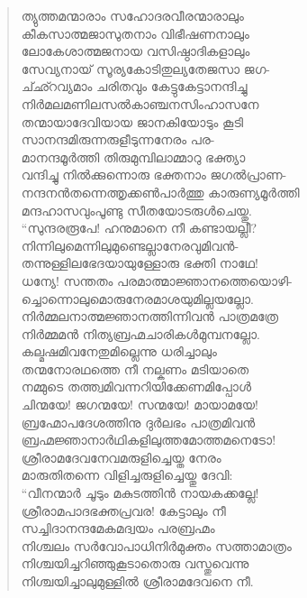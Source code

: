 \begin{verse}
ത്യുത്തമന്മാരാം സഹോദരവീരന്മാരാലും\\
കീകസാത്മജാസുതനാം വിഭീഷണനാലും\\
ലോകേശാത്മജനായ വസിഷ്ഠാദികളാലും\\
സേവ്യനായ് സൂര്യകോടിതുല്യതേജസാ ജഗ-\\
ച്ഛ്റവ്യമാം ചരിതവും കേട്ടുകേട്ടാനന്ദിച്ചു\\
നിര്‍മലമണിലസല്‍കാഞ്ചനസിംഹാസനേ\\
തന്മായാദേവിയായ ജാനകിയോടും കൂടി\\
സാനന്ദമിരുന്നരുളീടുന്നനേരം പര-\\
മാനന്ദമൂര്‍ത്തി തിരുമുമ്പിലാമ്മാറു ഭക്ത്യാ\\
വന്ദിച്ചു നില്‍ക്കുന്നൊരു ഭക്തനാം ജഗല്‍പ്രാണ-\\
നന്ദനന്‍തന്നെത്തൃക്കണ്‍പാര്‍ത്തു കാരുണ്യമൂര്‍ത്തി\\
മന്ദഹാസവുംപൂണ്ടു സീതയോടരുള്‍ചെയ്തു.\\
“സുന്ദരരൂപേ! ഹനുമാനെ നീ കണ്ടായല്ലീ?\\
നിന്നിലുമെന്നിലുമുണ്ടെല്ലാനേരവുമിവന്‍-\\
തന്നുള്ളിലഭേദയായുള്ളോരു ഭക്തി നാഥേ!\\
ധന്യേ! സന്തതം പരമാത്മാജ്ഞാനത്തെയൊഴി-\\
ച്ചൊന്നൊലുമൊരുനേരമാശയുമില്ലയല്ലോ.\\
നിര്‍മ്മലനാത്മജ്ഞാനത്തിന്നിവന്‍ പാത്രമത്രേ\\
നിര്‍മ്മമന്‍ നിത്യബ്രഹ്മചാരികള്‍മുമ്പനല്ലോ.\\
കല്മഷമിവനേതുമില്ലെന്നു ധരിച്ചാലും\\
തന്മനോരഥത്തെ നീ നല്കണം മടിയാതെ\\
നമ്മുടെ തത്ത്വമിവന്നറിയിക്കേണമിപ്പോള്‍\\
ചിന്മയേ! ജഗന്മയേ! സന്മയേ! മായാമയേ!\\
ബ്രഹ്മോപദേശത്തിനു ദുര്‍ലഭം പാത്രമിവന്‍\\
ബ്രഹ്മജ്ഞാനാര്‍ഥികളിലുത്തമോത്തമനെടോ!\\
ശ്രീരാമദേവനേവമരുളിച്ചെയ്ത നേരം\\
മാരുതിതന്നെ വിളിച്ചരുളിച്ചെയ്തു ദേവി:\\
“വീനന്മാര്‍ ചൂടും മകുടത്തിന്‍ നായകക്കല്ലേ!\\
ശ്രീരാമപാദഭക്തപ്രവര! കേട്ടാലും നീ\\
സച്ചിദാനന്ദമേകമദ്വയം പരബ്രഹ്മം\\
നിശ്ചലം സര്‍വോപാധിനിര്‍മുക്തം സത്താമാത്രം\\
നിശ്ചയിച്ചറിഞ്ഞുകൂടാതൊരു വസ്തുവെന്നു\\
നിശ്ചയിച്ചാലുമുള്ളില്‍ ശ്രീരാമദേവനെ നീ.\\

\end{verse}
